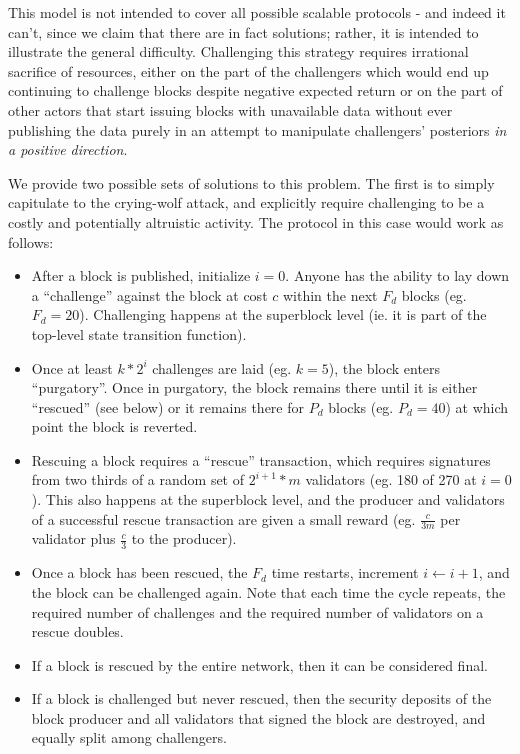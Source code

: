 \documentclass[11pt,a4paper]{report}
\theoremstyle{plain}
\theoremstyle{definition}
\theoremstyle{remark}
\begin{document}
This model is not intended to cover all possible scalable protocols - and indeed it can't, since we claim that there are in fact solutions; rather, it is intended to illustrate the general difficulty. Challenging this strategy requires irrational sacrifice of resources, either on the part of the challengers which would end up continuing to challenge blocks despite negative expected return or on the part of other actors that start issuing blocks with unavailable data without ever publishing the data purely in an attempt to manipulate challengers' posteriors \emph{in a positive direction}.

We provide two possible sets of solutions to this problem. The first is to simply capitulate to the crying-wolf attack, and explicitly require challenging to be a costly and potentially altruistic activity. The protocol in this case would work as follows:

\begin{itemize}
\item
After a block is published, initialize $i = 0$. Anyone has the ability to lay down a ``challenge'' against the block at cost $c$ within the next $F_d$ blocks (eg. $F_d = 20$). Challenging happens at the superblock level (ie. it is part of the top-level state transition function).
\item
Once at least $k * 2^i$ challenges are laid (eg. $k = 5$), the block enters ``purgatory''. Once in purgatory, the block remains there until it is either ``rescued'' (see below) or it remains there for $P_d$ blocks (eg. $P_d = 40$) at which point the block is reverted.
\item
Rescuing a block requires a ``rescue'' transaction, which requires signatures from two thirds of a random set of $2^{i+1} * m$ validators (eg. 180 of 270 at $i = 0$). This also happens at the superblock level, and the producer and validators of a successful rescue transaction are given a small reward (eg. $\frac{c}{3m}$ per validator plus $\frac{c}{3}$ to the producer).
\item
Once a block has been rescued, the $F_d$ time restarts, increment $i \leftarrow i + 1$, and the block can be challenged again. Note that each time the cycle repeats, the required number of challenges and the required number of validators on a rescue doubles.
\item
If a block is rescued by the entire network, then it can be considered final.
\item
If a block is challenged but never rescued, then the security deposits of the block producer and all validators that signed the block are destroyed, and equally split among challengers.
\end{itemize}
\end{document}
